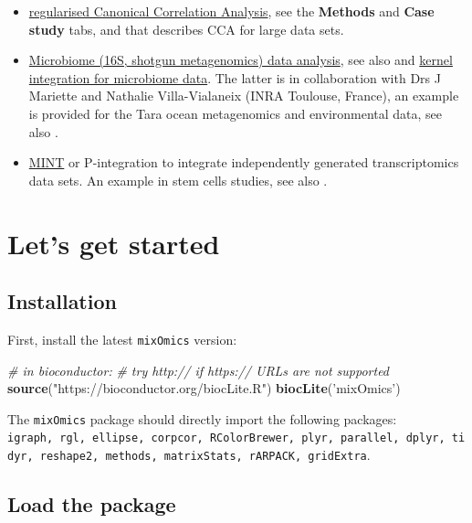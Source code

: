 \documentclass[]{book}
\newenvironment{Shaded}{\begin{snugshade}}{\end{snugshade}}
\newcommand{\KeywordTok}[1]{\textcolor[rgb]{0.13,0.29,0.53}{\textbf{#1}}}
\newcommand{\StringTok}[1]{\textcolor[rgb]{0.31,0.60,0.02}{#1}}
\newcommand{\CommentTok}[1]{\textcolor[rgb]{0.56,0.35,0.01}{\textit{#1}}}
\newcommand{\NormalTok}[1]{#1}
\theoremstyle{definition}
\theoremstyle{definition}
\theoremstyle{definition}
\theoremstyle{remark}
\begin{document}
\begin{itemize}
\item
  \href{http://www.mixOmics.org}{regularised Canonical Correlation
  Analysis}, see the \textbf{Methods} and \textbf{Case study} tabs, and
  \citep{Gon08} that describes CCA for large data sets.
\item
  \href{http://www.mixOmics.org/mixmc}{Microbiome (16S, shotgun
  metagenomics) data analysis}, see also \citep{Lec16} and
  \href{http://mixomics.org/mixkernel}{kernel integration for microbiome
  data}. The latter is in collaboration with Drs J Mariette and Nathalie
  Villa-Vialaneix (INRA Toulouse, France), an example is provided for
  the Tara ocean metagenomics and environmental data, see also
  \citep{Mar17}.
\item
  \href{http://mixomics.org/mixmint/}{MINT} or P-integration to
  integrate independently generated transcriptomics data sets. An
  example in stem cells studies, see also \citep{Roh16}.
\end{itemize}

\chapter{Let's get started}\label{start}

\section{Installation}\label{installation}

First, install the latest \texttt{mixOmics} version:

\begin{Shaded}
\begin{Highlighting}[]
\CommentTok{# in bioconductor:}
\CommentTok{# try http:// if https:// URLs are not supported}
\KeywordTok{source}\NormalTok{(}\StringTok{"https://bioconductor.org/biocLite.R"}\NormalTok{)}
\KeywordTok{biocLite}\NormalTok{(}\StringTok{'mixOmics'}\NormalTok{)}
\end{Highlighting}
\end{Shaded}

The \texttt{mixOmics} package should directly import the following
packages:
\texttt{igraph,\ rgl,\ ellipse,\ corpcor,\ RColorBrewer,\ plyr,\ parallel,\ dplyr,\ tidyr,\ reshape2,\ methods,\ matrixStats,\ rARPACK,\ gridExtra}.

\section{Load the package}\label{start:upload}
\end{document}
